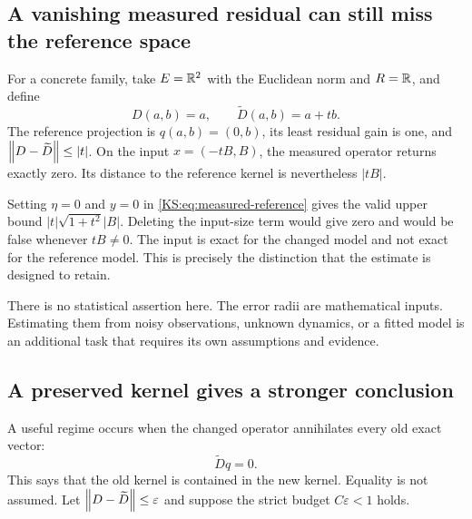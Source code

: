 \subsection{A vanishing measured residual can still miss the reference space}
For a concrete family, take \(E=\mathbb R^2\) with the Euclidean norm and \(R=\mathbb R\), and define
\[
 D(a,b)=a,\qquad \widetilde D(a,b)=a+tb.
\]
The reference projection is \(q(a,b)=(0,b)\), its least residual gain is one, and \(\left\lVert D-\widetilde D\right\rVert\le|t|\). On the input \(x=(-tB,B)\), the measured operator returns exactly zero. Its distance to the reference kernel is nevertheless \(|tB|\).

Setting \(\eta=0\) and \(y=0\) in \eqref{KS:eq:measured-reference} gives the valid upper bound \(|t|\sqrt{1+t^2}|B|\). Deleting the input-size term would give zero and would be false whenever \(tB\ne0\). The input is exact for the changed model and not exact for the reference model. This is precisely the distinction that the estimate is designed to retain.

There is no statistical assertion here. The error radii are mathematical inputs. Estimating them from noisy observations, unknown dynamics, or a fitted model is an additional task that requires its own assumptions and evidence.

\subsection{A preserved kernel gives a stronger conclusion}
A useful regime occurs when the changed operator annihilates every old exact vector:
\[
 \widetilde D q=0.
\]
This says that the old kernel is contained in the new kernel. Equality is not assumed. Let \(\left\lVert D-\widetilde D\right\rVert\le\varepsilon\) and suppose the strict budget \(C\varepsilon<1\) holds.

